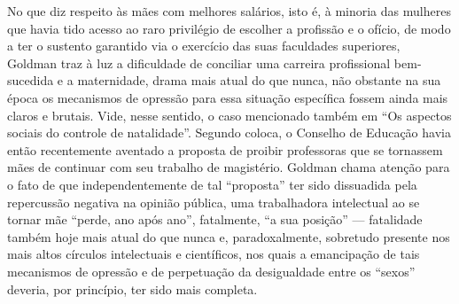 No que diz respeito às mães com melhores salários, isto é, à minoria das
mulheres que havia tido acesso ao raro privilégio de escolher a
profissão e o ofício, de modo a ter o sustento garantido via o exercício
das suas faculdades superiores, Goldman traz à luz a dificuldade de
conciliar uma carreira profissional bem-sucedida e a maternidade, drama
mais atual do que nunca, não obstante na sua época os mecanismos de
opressão para essa situação específica fossem ainda mais claros e
brutais. Vide, nesse sentido, o caso mencionado também em ``Os aspectos
sociais do controle de natalidade''. Segundo coloca, o Conselho de
Educação havia então recentemente aventado a proposta de proibir
professoras que se tornassem mães de continuar com seu trabalho de
magistério. Goldman chama atenção para o fato de que independentemente
de tal ``proposta'' ter sido dissuadida pela repercussão negativa na
opinião pública, uma trabalhadora intelectual ao se tornar mãe ``perde,
ano após ano'', fatalmente, ``a sua posição'' --- fatalidade também hoje
mais atual do que nunca e, paradoxalmente, sobretudo presente nos mais
altos círculos intelectuais e científicos, nos quais a emancipação de
tais mecanismos de opressão e de perpetuação da desigualdade entre os
``sexos'' deveria, por princípio, ter sido mais completa.

